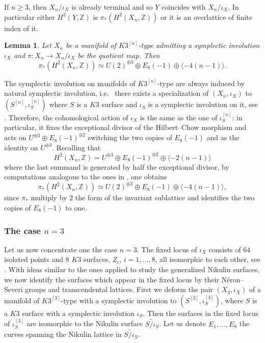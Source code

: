 \documentclass{amsart}
\newtheorem{lemma}[thm]{Lemma}
\theoremstyle{definition}
\numberwithin{equation}{section}
\numberwithin{equation}{section} \theoremstyle{definition}
\newcommand{\ra}{\rightarrow}
\newcommand\Z{\mathbb{Z}}
\begin{document}
If $n\geq 3$, then $X_n/\iota_X$ is already terminal and so $Y$ coincides with $X_n/\iota_X$. In particular either $H^2(Y,\Z)$ is $\pi_*(H^2(X_n,\Z))$ or it is an overlattice of finite index of it. 
\begin{lemma}\label{lem: pi* higher dimension} Let $X_n$ be a  manifold of $K3^{[n]}$-type admitting a symplectic involution $\iota_X$ and $\pi:X_n\ra X_n/\iota_X$ be the quotient map. Then $$\pi_*(H^2(X_n,\Z))\simeq U(2)^{\oplus 3}\oplus E_8(-1)\oplus \langle -4(n-1)\rangle.$$
\end{lemma}
\proof The symplectic involution on  manifolds of $K3^{[n]}$-type are always induced by natural symplectic involution, i.e.~ there exists a specialization of $(X_n,\iota_X)$ to $(S^{[n]},\iota_S^{[n]})$ where $S$ is a $K3$ surface and $\iota_S$ is a symplectic involution on it, see \cite{KMO}. Therefore, the cohomological action of $\iota_X$ is the same as the one of $\iota_S^{[n]}$: in particular, it fixes the exceptional divisor of the Hilbert--Chow morphism and acts on $U^{\oplus 3}\oplus E_8(-1)^{\oplus 2}$ switching the two copies of $E_8(-1)$ and as the identity on $U^{\oplus 3}$. Recalling that $$H^2(X_n,\Z)=U^{\oplus 3}\oplus E_8(-1)^{\oplus 2}\oplus \langle -2(n-1)\rangle$$ where the last summand is generated by  half the exceptional divisor, by computations analogous to the ones in \cite{Mor}, one obtains $$\pi_*(H^2(X_n,\Z))\simeq U(2)^{\oplus 3}\oplus E_8(-1)\oplus \langle -4(n-1)\rangle,$$ since $\pi_*$ multiply by 2 the form of the invariant sublattice and identifies the two copies of $E_8(-1)$ to one.\endproof

\subsubsection{The case $n=3$}
Let us now concentrate one the case $n=3$. The fixed locus of $\iota_X$ consists of $64$ isolated points and 8 $K3$ surfaces, $Z_i$, $i=1,\ldots, 8$, all isomorphic to each other, see \cite{KMO}.
With ideas similar to the ones applied to study the generalized Nikulin surfaces, we now identify the surfaces which appear in the fixed locus by their N\'eron--Severi groups and transcendental lattices. First we deform the pair $(X_3,\iota_X)$ of a  manifold of $K3^{[3]}$-type with a symplectic involution to $(S^{[3]},\iota_S^{[3]})$, where $S$ is a $K3$ surface with a symplectic involution $\iota_S$. Then the surfaces in the fixed locus of $\iota_{S}^{[3]}$ are isomorphic to the Nikulin surface $\widetilde{S/\iota_S}$. Let us denote $E_1,\dots, E_8$ the curves spanning the Nikulin lattice in $\widetilde{S/\iota_S}$.
\end{document}
